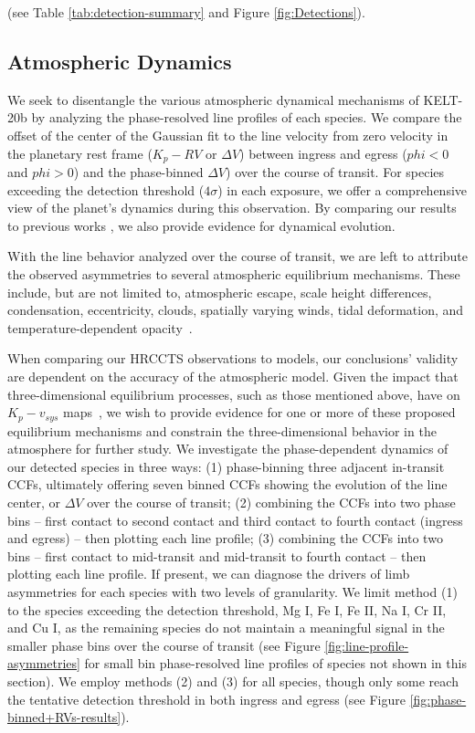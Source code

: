 \documentclass[twocolumn]{aastex631}
\begin{document}
        
        (see Table \ref{tab:detection-summary} and Figure \ref{fig:Detections}).
        \subsection{Atmospheric Dynamics}\label{subsec:Atmospheric Dynamics}

        We seek to disentangle the various atmospheric dynamical mechanisms of KELT-20b by analyzing the phase-resolved line profiles of each species. We compare the offset of the center of the Gaussian fit to the line velocity from zero velocity in the planetary rest frame ($K_p -RV$ or $\Delta V$) between ingress and egress ($phi < 0$ and $phi > 0$) and the phase-binned $\Delta V$) over the course of transit. For species exceeding the detection threshold ($4 \sigma$) in each exposure, we offer a comprehensive view of the planet's dynamics during this observation. By comparing our results to previous works \citep{}, we also provide evidence for dynamical evolution.

        With the line behavior analyzed over the course of transit, we are left to attribute the observed asymmetries to several atmospheric equilibrium mechanisms. These include, but are not limited to, atmospheric escape, scale height differences, condensation, eccentricity, clouds, spatially varying winds, tidal deformation, and temperature-dependent opacity~\citep{Savel2023}. 

        When comparing our HRCCTS observations to models, our conclusions' validity are dependent on the accuracy of the atmospheric model. Given the impact that three-dimensional equilibrium processes, such as those mentioned above, have on $K_p-v_{sys}$ maps~\citep{Wardenier2021}, we wish to provide evidence for one or more of these proposed equilibrium mechanisms and constrain the three-dimensional behavior in the atmosphere for further study. We investigate the phase-dependent dynamics of our detected species in three ways: (1) phase-binning three adjacent in-transit CCFs, ultimately offering seven binned CCFs showing the evolution of the line center, or $\Delta V$ over the course of transit; (2) combining the CCFs into two phase bins -- first contact to second contact and third contact to fourth contact (ingress and egress) -- then plotting each line profile; (3) combining the CCFs into two bins -- first contact to mid-transit and mid-transit to fourth contact -- then plotting each line profile. If present, we can diagnose the drivers of limb asymmetries for each species with two levels of granularity. We limit method (1) to the species exceeding the detection threshold, Mg I, Fe I, Fe II, Na I, Cr II, and Cu I, as the remaining species do not maintain a meaningful signal in the smaller phase bins over the course of transit (see Figure \ref{fig:line-profile-asymmetries} for small bin phase-resolved line profiles of species not shown in this section). We employ methods (2) and (3) for all species, though only some reach the tentative detection threshold in both ingress and egress (see Figure \ref{fig:phase-binned+RVs-results}).
\end{document}
